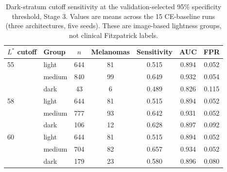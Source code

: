 \documentclass[11pt]{article}
\begin{document}
\begin{table}[t]
\centering
\small
\caption{Dark-stratum cutoff sensitivity at the validation-selected 95\% specificity threshold, Stage 3. Values are means across the 15 CE-baseline runs (three architectures, five seeds). These are image-based lightness groups, not clinical Fitzpatrick labels.}
\label{tab:darkskin}
\begin{tabular}{llccccc}
\toprule
$L^*$ cutoff & Group & $n$ & Melanomas & Sensitivity & AUC & FPR \\
\midrule
55 & light & 644 & 81 & 0.515 & 0.894 & 0.052 \\
 & medium & 840 & 99 & 0.649 & 0.932 & 0.054 \\
 & dark & 43 & 6 & 0.489 & 0.826 & 0.115 \\
\midrule
58 & light & 644 & 81 & 0.515 & 0.894 & 0.052 \\
 & medium & 777 & 93 & 0.642 & 0.931 & 0.052 \\
 & dark & 106 & 12 & 0.628 & 0.897 & 0.092 \\
\midrule
60 & light & 644 & 81 & 0.515 & 0.894 & 0.052 \\
 & medium & 704 & 82 & 0.657 & 0.934 & 0.052 \\
 & dark & 179 & 23 & 0.580 & 0.896 & 0.080 \\
\bottomrule
\end{tabular}
\end{table}

\begin{table}[t]
\centering
\small
\caption{Adjusted odds ratios for false positives and false negatives at the CE baseline, Stage 3. Each model includes perilesional $L^*$, lesion contrast, log lesion area, age, sex, anatomical site, and acquisition source. Odds ratios are per one standard deviation; intervals are lesion-cluster bootstrap 95\% CIs.}
\label{tab:adjusted}
\end{table}
\end{document}
